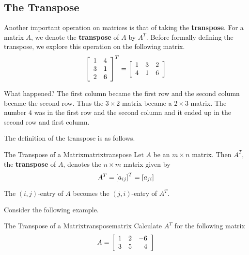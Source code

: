 \subsection{The Transpose}

Another important operation on matrices is that of taking the \textbf{transpose}. For a matrix $A$, we denote the
\textbf{transpose} of $A$ by $A^T$. Before formally defining the transpose, we explore this
operation on the following matrix.
\begin{equation*}
\left[
\begin{array}{cc}
1 & 4 \\
3 & 1 \\
2 & 6
\end{array}
\right] ^{T}=\allowbreak \left[
\begin{array}{ccc}
1 & 3 & 2 \\
4 & 1 & 6
\end{array}
\right]
\end{equation*}

What happened? The first column became the first row and the second column
became the second row. Thus the $3\times 2$ matrix became a $2\times 3$
matrix. The number $4$ was in the first row and the second column and it
ended up in the second row and first column. 

The definition of the transpose is as follows.

\begin{definition}{The Transpose of a Matrix}{matrixtranspose}
Let $A$ be an $m\times n$ matrix. Then $A^{T}$, the \textbf{transpose} of $A$,  denotes the $n\times m$
matrix given by 
\begin{equation*}
A^{T} = \left[ a _{ij}\right] ^{T}= \left[ a_{ji} \right]
\end{equation*}
\end{definition}

The $\left( i, j  \right)$-entry of $A$ becomes the 
$\left( j,i \right)$-entry of $A^T$. 

Consider the following example.

\begin{example}{The Transpose of a Matrix}{transposematrix}
Calculate $A^T$ for the following matrix
\begin{equation*}
A = \left[
\begin{array}{rrr}
1 & 2 & -6 \\
3 & 5 & 4
\end{array}
\right]
\end{equation*}
\end{example}

